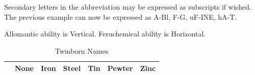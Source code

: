 \documentclass[conference]{IEEEtran}
\begin{document}
Secondary letters in the abbreviation may be expressed as subscripts if wished.
The previous example can now be expressed as A-Bl, F-G, uF-INE, hA-T.  

{}
 
 
 
 
 
 
 
 
 
 
\newpage{}

\clearpage
\onecolumn

\begin{table}[h]
	
	\caption{Twinborn Names}
	Allomantic ability is Vertical.  Feruchemical ability is Horizontal.
	\begin{center}
	
	\begin{tabular}{|l |c |c |c |c |c |c | }
		\hline
		\cellcolor{black}&None&Iron&Steel&Tin&Pewter&Zinc\\\hline
		

\end{tabular}
\end{center}
\end{table}
\end{document}

